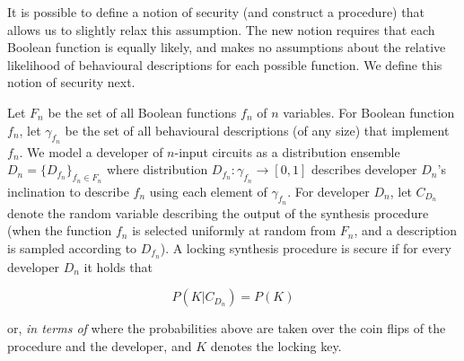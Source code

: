 \begin{definition}
It is possible to define a notion of security (and construct a procedure) that allows us to slightly relax this assumption. The new notion requires that each Boolean function is equally likely, and makes no assumptions about the relative likelihood of behavioural descriptions for each possible function. We define this notion of security next.

\end{definition}



\begin{definition} Let $F_n$ be the set of all Boolean functions $f_n$ of $n$ variables. For Boolean function $f_n$, let $\gamma_{f_n}$ be the set of all behavioural descriptions (of any size) that implement $f_n$. We model a developer of $n$-input circuits as a distribution ensemble $D_n=\{D_{f_n}\}_{f_n\in F_n}$ where distribution $D_{f_n}:\gamma_{f_n}\rightarrow [0,1]$ describes developer $D_n$'s inclination to describe $f_n$ using each element of $\gamma_{f_n}$. For developer $D_n$, let $C_{D_n}$ denote the random variable describing the output of the synthesis procedure (when the function $f_n$ is selected uniformly at random from $F_n$, and a description is sampled according to $D_{f_n}$). A locking synthesis procedure is secure if for every developer $D_n$ it holds that

$$ P(K|C_{D_n})=P(K) $$

or, \emph{in terms of }
where the probabilities above are taken over the coin flips of the procedure and the developer, and $K$ denotes the locking key.
\end{definition}

